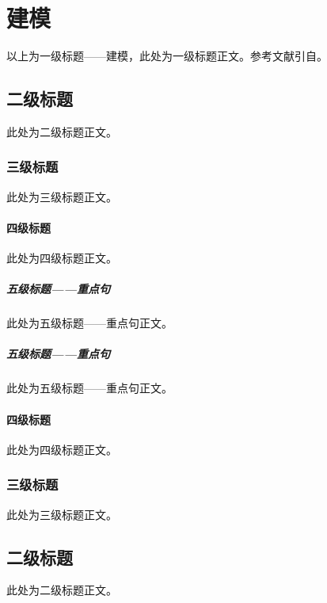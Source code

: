 
\chapter{建模}%
以上为一级标题——建模，此处为一级标题正文。参考文献引自\cite{texbook}。
\section{二级标题}
此处为二级标题正文。
\subsection{三级标题}
此处为三级标题正文。
\subsubsection{四级标题}
此处为四级标题正文。
\paragraph{五级标题——重点句}
此处为五级标题——重点句正文。
\paragraph{五级标题——重点句}
此处为五级标题——重点句正文。
\subsubsection{四级标题}
此处为四级标题正文。
\subsection{三级标题}
此处为三级标题正文。
\section{二级标题}
此处为二级标题正文。
